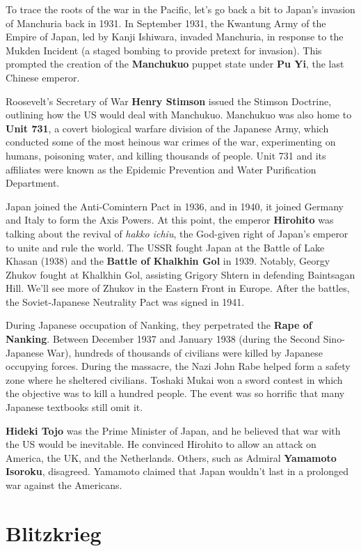 To trace the roots of the war in the Pacific, let's go back a bit to Japan's invasion of Manchuria back in 1931.
In September 1931, the Kwantung Army of the Empire of Japan, led by Kanji Ishiwara, invaded Manchuria,
in response to the Mukden Incident (a staged bombing to provide pretext for invasion).
This prompted the creation of the \textbf{Manchukuo} puppet state under \textbf{Pu Yi}, the last Chinese emperor.

Roosevelt's Secretary of War \textbf{Henry Stimson} issued the Stimson Doctrine,
outlining how the US would deal with Manchukuo.
Manchukuo was also home to \textbf{Unit 731}, a covert biological warfare division of the Japanese Army,
which conducted some of the most heinous war crimes of the war,
experimenting on humans, poisoning water, and killing thousands of people.
Unit 731 and its affiliates were known as the Epidemic Prevention and Water Purification Department.

Japan joined the Anti-Comintern Pact in 1936, and in 1940, it joined Germany and Italy to form the Axis Powers.
At this point, the emperor \textbf{Hirohito} was talking about the revival of \textit{hakko ichiu},
the God-given right of Japan's emperor to unite and rule the world.
The USSR fought Japan at the Battle of Lake Khasan (1938) and the \textbf{Battle of Khalkhin Gol} in 1939.
Notably, Georgy Zhukov fought at Khalkhin Gol, assisting Grigory Shtern in defending Baintsagan Hill.
We'll see more of Zhukov in the Eastern Front in Europe.
After the battles, the Soviet-Japanese Neutrality Pact was signed in 1941.

During Japanese occupation of Nanking, they perpetrated the \textbf{Rape of Nanking}.
Between December 1937 and January 1938 (during the Second Sino-Japanese War),
hundreds of thousands of civilians were killed by Japanese occupying forces.
During the massacre, the Nazi John Rabe helped form a safety zone where he sheltered civilians.
Toshaki Mukai won a sword contest in which the objective was to kill a hundred people.
The event was so horrific that many Japanese textbooks still omit it.

\textbf{Hideki Tojo} was the Prime Minister of Japan, and he believed that war with the US would be inevitable.
He convinced Hirohito to allow an attack on America, the UK, and the Netherlands.
Others, such as Admiral \textbf{Yamamoto Isoroku}, disagreed.
Yamamoto claimed that Japan wouldn't last in a prolonged war against the Americans.


\section{Blitzkrieg}


